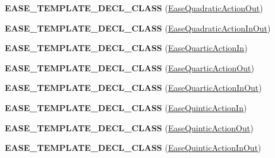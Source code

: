 \begin{DoxyCompactItemize}
{\bfseries E\+A\+S\+E\+\_\+\+T\+E\+M\+P\+L\+A\+T\+E\+\_\+\+D\+E\+C\+L\+\_\+\+C\+L\+A\+SS} (\hyperlink{classEaseQuadraticActionOut}{Ease\+Quadratic\+Action\+Out})
\item 
\mbox{\label{group__actions_ga17749c6647b40df517075bc67add6fde}} 
{\bfseries E\+A\+S\+E\+\_\+\+T\+E\+M\+P\+L\+A\+T\+E\+\_\+\+D\+E\+C\+L\+\_\+\+C\+L\+A\+SS} (\hyperlink{classEaseQuadraticActionInOut}{Ease\+Quadratic\+Action\+In\+Out})
\item 
\mbox{\label{group__actions_ga5772bbd22f815450d9bfdd2c232a6a78}} 
{\bfseries E\+A\+S\+E\+\_\+\+T\+E\+M\+P\+L\+A\+T\+E\+\_\+\+D\+E\+C\+L\+\_\+\+C\+L\+A\+SS} (\hyperlink{classEaseQuarticActionIn}{Ease\+Quartic\+Action\+In})
\item 
\mbox{\label{group__actions_ga4c0ca8d4743b4f60b328e4bf388d73d1}} 
{\bfseries E\+A\+S\+E\+\_\+\+T\+E\+M\+P\+L\+A\+T\+E\+\_\+\+D\+E\+C\+L\+\_\+\+C\+L\+A\+SS} (\hyperlink{classEaseQuarticActionOut}{Ease\+Quartic\+Action\+Out})
\item 
\mbox{\label{group__actions_ga17fee74d1a3eafce6f2783672904971a}} 
{\bfseries E\+A\+S\+E\+\_\+\+T\+E\+M\+P\+L\+A\+T\+E\+\_\+\+D\+E\+C\+L\+\_\+\+C\+L\+A\+SS} (\hyperlink{classEaseQuarticActionInOut}{Ease\+Quartic\+Action\+In\+Out})
\item 
\mbox{\label{group__actions_ga75218bf18e33b84acd4bbd666ab370fb}} 
{\bfseries E\+A\+S\+E\+\_\+\+T\+E\+M\+P\+L\+A\+T\+E\+\_\+\+D\+E\+C\+L\+\_\+\+C\+L\+A\+SS} (\hyperlink{classEaseQuinticActionIn}{Ease\+Quintic\+Action\+In})
\item 
\mbox{\label{group__actions_gab6b54048919fa67fe10e651881f25a0e}} 
{\bfseries E\+A\+S\+E\+\_\+\+T\+E\+M\+P\+L\+A\+T\+E\+\_\+\+D\+E\+C\+L\+\_\+\+C\+L\+A\+SS} (\hyperlink{classEaseQuinticActionOut}{Ease\+Quintic\+Action\+Out})
\item 
\mbox{\label{group__actions_gae1b659c7d8fafe510295e142cb3c244c}} 
{\bfseries E\+A\+S\+E\+\_\+\+T\+E\+M\+P\+L\+A\+T\+E\+\_\+\+D\+E\+C\+L\+\_\+\+C\+L\+A\+SS} (\hyperlink{classEaseQuinticActionInOut}{Ease\+Quintic\+Action\+In\+Out})
\item 
\mbox{\label{group__actions_ga3e56ccd133e9a048e8ca504fad778696}} 

\end{DoxyCompactItemize}
